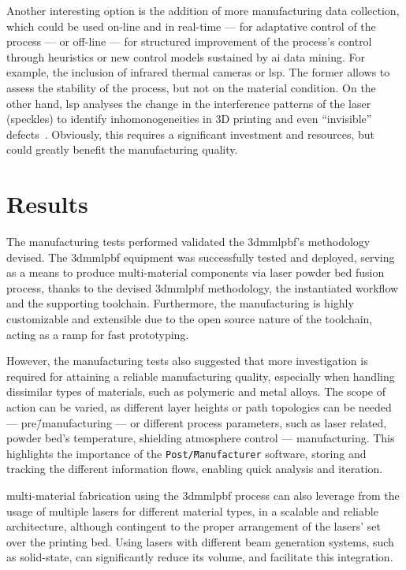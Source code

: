 Another interesting option is the addition of more manufacturing data
collection, which could be used on-line and in real-time --- for adaptative control of the
process --- or off-line --- for structured improvement of the process's control
through heuristics or new control models sustained by \gls{ai} data mining. For
example, the inclusion of infrared thermal cameras or \gls{lsp}. The former
allows to assess the stability of the process, but not on the material
condition. On the other hand, \gls{lsp} analyses the change in the interference
patterns of the laser (speckles) to identify inhomonogeneities in 3D printing
and even ``invisible'' defects~\cite{chen2019laser}.
Obviously, this requires a significant investment and resources, but could
greatly benefit the manufacturing quality.

\section{Results}%
\label{sec:results}
The manufacturing tests performed validated the \gls{3dmmlpbf}'s methodology
devised. The \gls{3dmmlpbf} equipment was successfully tested and
deployed, serving as a means to produce multi-material components via laser
powder bed fusion process, thanks to the devised \gls{3dmmlpbf} methodology, the
instantiated workflow and the supporting toolchain. Furthermore, the
manufacturing is highly customizable and extensible due to the open source
nature of the toolchain, acting as a ramp for fast prototyping.

However, the manufacturing tests also suggested that more investigation is
required for attaining a reliable manufacturing quality, especially when
handling dissimilar types of materials, such as polymeric and metal alloys. The
scope of action can be varied, as different layer heights or path topologies can
be needed --- pre\=/manufacturing --- or different process parameters, such as
laser related, powder bed's temperature, shielding atmosphere control --- manufacturing.
This highlights the importance of the \texttt{Post\=/Manufacturer} software,
storing and tracking the different information flows, enabling quick analysis and iteration.

multi-material fabrication using the \gls{3dmmlpbf} process can also leverage
from the usage
of multiple lasers for different material types, in a scalable and reliable
architecture, although contingent to the proper arrangement of the lasers' set
over the printing bed. Using lasers with different beam generation systems, such
as solid-state, can significantly reduce its volume, and facilitate this
integration.


